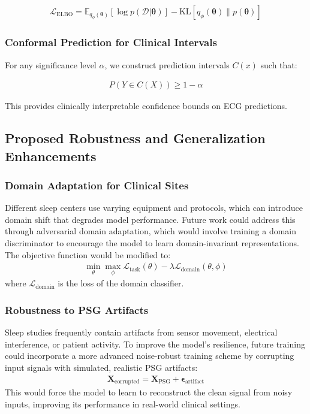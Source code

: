 \documentclass[11pt,en]{elegantpaper}
\begin{document}
\begin{align}
\mathcal{L}_{\text{ELBO}} = \mathbb{E}_{q_\phi(\boldsymbol{\theta})}[\log p(\mathcal{D}|\boldsymbol{\theta})] - \text{KL}[q_\phi(\boldsymbol{\theta}) \| p(\boldsymbol{\theta})]
\end{align}

\subsubsection{Conformal Prediction for Clinical Intervals}
For any significance level $\alpha$, we construct prediction intervals $C(x)$ such that:

\begin{align}
P(Y \in C(X)) \geq 1 - \alpha
\end{align}

This provides clinically interpretable confidence bounds on ECG predictions.

\subsection{Proposed Robustness and Generalization Enhancements}

\subsubsection{Domain Adaptation for Clinical Sites}
Different sleep centers use varying equipment and protocols, which can introduce domain shift that degrades model performance. Future work could address this through adversarial domain adaptation, which would involve training a domain discriminator to encourage the model to learn domain-invariant representations. The objective function would be modified to:
\begin{align}
\min_{\theta} \max_{\phi} \mathcal{L}_{\text{task}}(\theta) - \lambda \mathcal{L}_{\text{domain}}(\theta, \phi)
\end{align}
where $\mathcal{L}_{\text{domain}}$ is the loss of the domain classifier.

\subsubsection{Robustness to PSG Artifacts}
Sleep studies frequently contain artifacts from sensor movement, electrical interference, or patient activity. To improve the model's resilience, future training could incorporate a more advanced noise-robust training scheme by corrupting input signals with simulated, realistic PSG artifacts:
\begin{align}
\mathbf{X}_{\text{corrupted}} = \mathbf{X}_{\text{PSG}} + \boldsymbol{\epsilon}_{\text{artifact}}
\end{align}
This would force the model to learn to reconstruct the clean signal from noisy inputs, improving its performance in real-world clinical settings.
\end{document}
